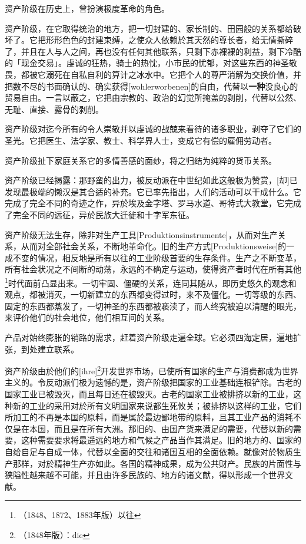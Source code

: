 \documentclass[a4paper,12pt]{ctexart}
\begin{document}
资产阶级在历史上，曾扮演极度革命的角色。


资产阶级，在它取得统治的地方，把一切封建的、家长制的、田园般的关系都给破坏了。它把形形色色的封建束缚，之使众人依赖於其天然的尊长者，给无情撕碎了，并且在人与人之间，再也没有任何其他联系，只剩下赤裸裸的利益，剩下冷酷的「现金交易」。虔诚的狂热，骑士的热忱，小市民的忧郁，对这些东西的神圣敬畏，都被它溺死在自私自利的算计之冰水中。它把个人的尊严消解为交换价值，并把数不尽的书面确认的、确实获得[wohlerworbenen]的自由，代替以\textbf{一种}没良心的贸易自由。一言以蔽之，它把由宗教的、政治的幻觉所掩盖的剥削，代替以公然、无耻、直接、露骨的剥削。

资产阶级对迄今所有的令人崇敬并以虔诚的战兢来看待的诸多职业，剥夺了它们的圣光。它把医生、法学家、教士、科学界人士，变成它有偿的雇佣劳动者。

资产阶级扯下家庭关系它的多情善感的面纱，将之归结为纯粹的货币关系。


资产阶级已经揭露：那野蛮的出力，被反动派在中世纪如此这般极为赞赏，[却]已发现最极端的懒汉是其合适的补充。它已率先指出，人们的活动可以干成什么。它完成了完全不同的奇迹之作，异於埃及金字塔、罗马水道、哥特式大教堂，它完成了完全不同的远征，异於民族大迁徙和十字军东征。

资产阶级无法生存，除非对生产工具[Produktionsinstrumente]，从而对生产关系，从而对全部社会关系，不断地革命化。旧的生产方式[Produktionsweise]的一成不变的情况，相反地是所有以往的工业阶级首要的生存条件。生产之不断变革，所有社会状况之不间断的动荡，永远的不确定与运动，使得资产者时代在所有其他\footnote{（1848、1872、1883年版）以往}时代面前凸显出来。一切牢固、僵硬的关系，连同其随从，即历史悠久的观念和观点，都被消灭，一切新建立的东西都变得过时，来不及僵化。一切等级的东西、固定的东西都蒸发了，一切神圣的东西都被亵渎了，而人终究被迫以清醒的眼光，来评价他们的社会地位，他们相互间的关系。

产品对始终膨胀的销路的需求，赶着资产阶级走遍全球。它必须四海定居，遍地扩张，到处建立联系。


资产阶级由於他们的[ihre]\footnote{（1848年版）：die}开发世界市场，已使所有国家的生产与消费都成为世界主义的。令反动派们极为遗憾的是，资产阶级把国家的工业基础连根铲除。古老的国家工业已被毁灭，而且每日还在被毁灭。古老的国家工业被排挤以新的工业，这种新的工业的采用对於所有文明国家来说都生死攸关；被排挤以这样的工业，它们所加工的不再是本国的原料，而是属於最边鄙地带的原料，且其工业产品的消耗不仅是在本国，而且是在所有大洲。那旧的、由国产货来满足的需要，代替以新的需要，这种需要要求将最遥远的地方和气候之产品当作其满足。旧的地方的、国家的自给自足与自成一体，代替以全面的交往和诸国互相的全面依赖。就像对於物质生产那样，对於精神生产亦如此。各国的精神成果，成为公共财产。民族的片面性与狭隘性越来越不可能，并且由许多民族的、地方的诸文献，得以形成一个世界文献。
\end{document}
